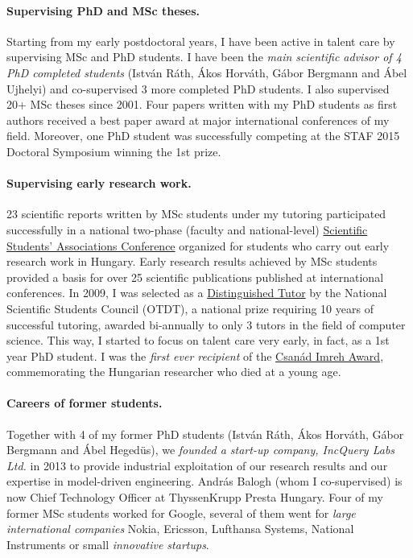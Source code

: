 \documentclass[a4paper,11pt]{report}
\begin{document}
\paragraph{Supervising PhD and MSc theses.}
Starting from my early postdoctoral years, I have been active in talent care by supervising MSc and PhD students. I have been the \emph{main scientific advisor of 4 PhD completed students} (István Ráth, Ákos Horváth, Gábor Bergmann and Ábel Ujhelyi) and co-supervised 3 more completed PhD students. I also supervised 20+ MSc theses since 2001. Four papers written with my PhD students as first authors received a best paper award at major international conferences of my field. 
Moreover, one PhD student was successfully competing at the STAF 2015 Doctoral Symposium winning the 1st prize. 


\paragraph{Supervising early research work.} 
23 scientific reports written by MSc students under my tutoring participated successfully in a national two-phase (faculty and national-level) \href{http://www.otdt.hu/hu/cms/otdk/orszagos-tudomanyos-diakkori-konferencia/}{Scientific Students’ Associations Conference} organized for students who carry out early research work in Hungary. Early research results achieved by MSc students provided a basis for over 25 scientific publications published at international conferences. In 2009, I was selected as a \href{http://www.otdt.hu/page/kituntetesek/mak2009.php}{Distinguished Tutor} by the National Scientific Students Council (OTDT), a national prize requiring 10 years of successful tutoring, awarded bi-annually to only 3 tutors in the field of computer science. This way, I started to focus on talent care very early, in fact, as a 1st year PhD student. I was the \emph{first ever recipient} of the \href{https://otdk2017.mik.uni-pannon.hu/index.php/eredmenyek}{Csanád Imreh Award}, commemorating the Hungarian researcher who died %
at a young age. 

\paragraph{Careers of former students.} Together with 4 of my former PhD students (István Ráth, Ákos Horváth, Gábor Bergmann and Ábel Hegedüs), we \emph{founded a start-up company, IncQuery Labs Ltd.} in 2013 to provide industrial exploitation of our research results and our expertise in model-driven engineering. András Balogh (whom I co-supervised) is now Chief Technology Officer at ThyssenKrupp Presta Hungary. Four of my former MSc students worked for Google, several of them went for \emph{large international companies} Nokia, Ericsson, Lufthansa Systems, National Instruments or small \emph{innovative startups}.
\end{document}
